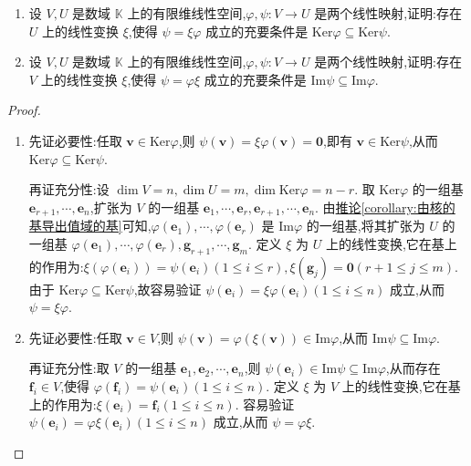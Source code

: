 \documentclass[../../main.tex]{subfiles}%
\begin{document}
\begin{proposition}\label{proposition:核空间和值域与线性映射}
\begin{enumerate}[(1)]
\item 设 \(V,U\) 是数域 \(\mathbb{K}\) 上的有限维线性空间,\(\varphi,\psi:V\to U\) 是两个线性映射,证明:存在 \(U\) 上的线性变换 \(\xi\),使得 \(\psi = \xi\varphi\) 成立的充要条件是 \(\text{Ker}\varphi\subseteq\text{Ker}\psi\).

\item 设 \(V,U\) 是数域 \(\mathbb{K}\) 上的有限维线性空间,\(\varphi,\psi:V\to U\) 是两个线性映射,证明:存在 \(V\) 上的线性变换 \(\xi\),使得 \(\psi = \varphi\xi\) 成立的充要条件是 \(\text{Im}\psi\subseteq\text{Im}\varphi\).
\end{enumerate}
\end{proposition}
\begin{proof}
\begin{enumerate}[(1)]
\item 先证必要性:任取 \(\boldsymbol{v}\in\text{Ker}\varphi\),则 \(\psi(\boldsymbol{v}) = \xi\varphi(\boldsymbol{v}) = \boldsymbol{0}\),即有 \(\boldsymbol{v}\in\text{Ker}\psi\),从而 \(\text{Ker}\varphi\subseteq\text{Ker}\psi\). 

再证充分性:设 \(\dim V = n,\dim U = m,\dim\text{Ker}\varphi = n - r\). 取 \(\text{Ker}\varphi\) 的一组基 \(\boldsymbol{e}_{r + 1},\cdots,\boldsymbol{e}_n\),扩张为 \(V\) 的一组基 \(\boldsymbol{e}_1,\cdots,\boldsymbol{e}_r,\boldsymbol{e}_{r + 1},\cdots,\boldsymbol{e}_n\). 由\hyperref[corollary:由核的基导出值域的基]{推论\ref{corollary:由核的基导出值域的基}}可知,\(\varphi(\boldsymbol{e}_1),\cdots,\varphi(\boldsymbol{e}_r)\) 是 \(\text{Im}\varphi\) 的一组基,将其扩张为 \(U\) 的一组基 \(\varphi(\boldsymbol{e}_1),\cdots,\varphi(\boldsymbol{e}_r),\boldsymbol{g}_{r + 1},\cdots,\boldsymbol{g}_m\). 定义 \(\xi\) 为 \(U\) 上的线性变换,它在基上的作用为:\(\xi(\varphi(\boldsymbol{e}_i)) = \psi(\boldsymbol{e}_i)(1\leqslant  i\leqslant  r),\xi(\boldsymbol{g}_j) = \boldsymbol{0}(r + 1\leqslant  j\leqslant  m)\). 由于 \(\text{Ker}\varphi\subseteq\text{Ker}\psi\),故容易验证 \(\psi(\boldsymbol{e}_i) = \xi\varphi(\boldsymbol{e}_i)(1\leqslant  i\leqslant  n)\) 成立,从而 \(\psi = \xi\varphi\).

\item 先证必要性:任取 \(\boldsymbol{v}\in V\),则 \(\psi(\boldsymbol{v}) = \varphi(\xi(\boldsymbol{v}))\in\text{Im}\varphi\),从而 \(\text{Im}\psi\subseteq\text{Im}\varphi\). 

再证充分性:取 \(V\) 的一组基 \(\boldsymbol{e}_1,\boldsymbol{e}_2,\cdots,\boldsymbol{e}_n\),则 \(\psi(\boldsymbol{e}_i)\in\text{Im}\psi\subseteq\text{Im}\varphi\),从而存在 \(\boldsymbol{f}_i\in V\),使得 \(\varphi(\boldsymbol{f}_i) = \psi(\boldsymbol{e}_i)(1\leqslant  i\leqslant  n)\). 定义 \(\xi\) 为 \(V\) 上的线性变换,它在基上的作用为:\(\xi(\boldsymbol{e}_i) = \boldsymbol{f}_i(1\leqslant  i\leqslant  n)\). 容易验证 \(\psi(\boldsymbol{e}_i) = \varphi\xi(\boldsymbol{e}_i)(1\leqslant  i\leqslant  n)\) 成立,从而 \(\psi = \varphi\xi\).
\end{enumerate}

\end{proof}
\end{document}
